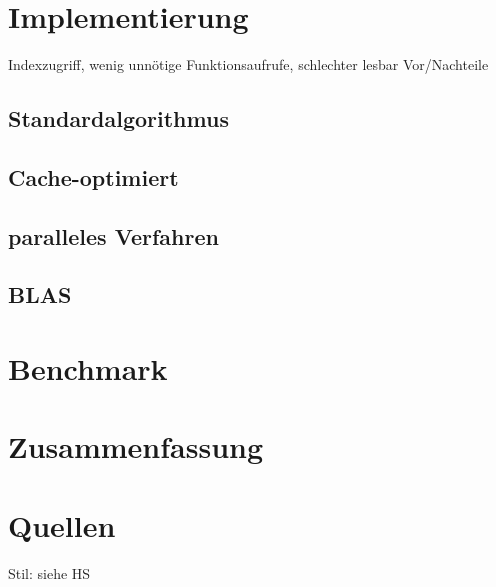 \documentclass[a4paper,11pt]{scrartcl}
\begin{document}
\section{Implementierung}
Indexzugriff, wenig unnötige Funktionsaufrufe, schlechter lesbar
Vor/Nachteile
\subsection{Standardalgorithmus}
\subsection{Cache-optimiert}
\subsection{paralleles Verfahren}
\subsection{BLAS}


\section{Benchmark}

\section{Zusammenfassung}

\section{Quellen}
Stil: siehe HS
\end{document}
